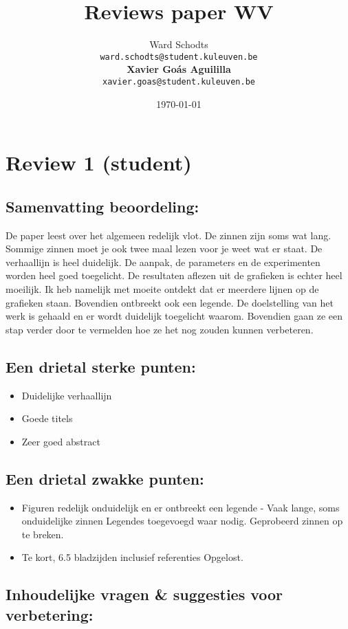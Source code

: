 \documentclass[11pt]{article}
\author{
  Ward Schodts\\
  \texttt{ward.schodts@student.kuleuven.be}
  \\[3ex]
  \textbf{Xavier Go\'as Aguililla}\\
  \texttt{xavier.goas@student.kuleuven.be}
}
\date{\today}
\title{Reviews paper WV}
\begin{document}
\maketitle
\section{Review 1 (student)}

\subsection{Samenvatting beoordeling:}
De paper leest over het algemeen redelijk vlot. De zinnen zijn soms wat lang.
Sommige zinnen moet je ook twee maal lezen voor je weet wat er staat. De
verhaallijn is heel duidelijk. De aanpak, de parameters en de experimenten
worden heel goed toegelicht. De resultaten aflezen uit de grafieken is echter
heel moeilijk. Ik heb namelijk met moeite ontdekt dat er meerdere lijnen op de
grafieken staan. Bovendien ontbreekt ook een legende. De doelstelling van het
werk is gehaald en er wordt duidelijk toegelicht waarom. Bovendien gaan ze een
stap verder door te vermelden hoe ze het nog zouden kunnen verbeteren.

\subsection{Een drietal sterke punten:}

\begin{itemize}
\item Duidelijke verhaallijn
\item Goede titels
\item Zeer goed abstract
\end{itemize}

\subsection{Een drietal zwakke punten:}
\begin{itemize}
\item Figuren redelijk onduidelijk en er ontbreekt een legende - Vaak lange, soms onduidelijke zinnen {\color{red} Legendes toegevoegd waar nodig. Geprobeerd zinnen op te breken.}

\item Te kort, 6.5 bladzijden inclusief referenties {\color{red} Opgelost.}
\end{itemize}

\subsection{Inhoudelijke vragen \& suggesties voor verbetering:}
\end{document}
